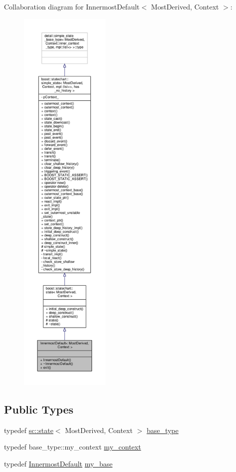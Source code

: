 Collaboration diagram for Innermost\+Default$<$ Most\+Derived, Context $>$\+:
\nopagebreak
\begin{figure}[H]
\begin{center}
\leavevmode
\includegraphics[height=550pt]{struct_innermost_default__coll__graph}
\end{center}
\end{figure}
\subsection*{Public Types}
\begin{DoxyCompactItemize}
\item 
typedef \mbox{\hyperlink{classboost_1_1statechart_1_1state}{sc\+::state}}$<$ Most\+Derived, Context $>$ \mbox{\hyperlink{struct_innermost_default_a4b29ec4327dbb23adac6b62bee2d719f}{base\+\_\+type}}
\item 
typedef base\+\_\+type\+::my\+\_\+context \mbox{\hyperlink{struct_innermost_default_a0aab337364dec3101e80f293b709d53d}{my\+\_\+context}}
\item 
typedef \mbox{\hyperlink{struct_innermost_default}{Innermost\+Default}} \mbox{\hyperlink{struct_innermost_default_ac389fcf982a5cc72aa61a8ee2e0f4699}{my\+\_\+base}}
\end{DoxyCompactItemize}
